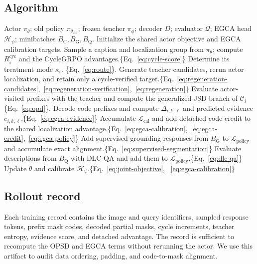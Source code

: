 \documentclass{article}
\newcommand{\ours}{\textsc{Pixel-OPSD}}
\begin{document}
\subsection{Algorithm}
\begin{algorithm}[h!t]
\caption{One training iteration of \ours{}.}\label{alg:pixel-opsd}
\small
\begin{algorithmic}[1]
\REQUIRE Actor $\pi_\theta$; old policy $\pi_{\theta_{\mathrm{old}}}$; frozen teacher $\pi_\phi$; decoder $D$; evaluator $\mathcal Q$; EGCA head $\mathcal H_\psi$; minibatches $B_{\mathrm{C}},B_{\mathrm{G}},B_{\mathrm{Q}}$.
\STATE Initialize the shared actor objective and EGCA calibration targets.
\STATE Sample a caption and localization group from $\pi_\theta$; compute $R_i^{\mathrm{cyc}}$ and the CycleGRPO advantages.\{Eq.~\eqref{eq:cycle-score}\}
\STATE Determine its treatment mode $\kappa_i$. \{Eq.~\eqref{eq:route}\}.
\STATE Generate teacher candidates, rerun actor localization, and retain only a cycle-verified target.\{Eq.~\eqref{eq:regeneration-candidates},~\eqref{eq:regeneration-verification},~\eqref{eq:regeneration}\}
\STATE Evaluate actor-visited prefixes with the teacher and compute the generalized-JSD branch of $\mathcal C_i$\{Eq.~\eqref{eq:opd}\}.
\ENDIF
{}
\STATE Decode code prefixes and compute $\Delta_{i,k,\ell}$ and predicted evidence $e_{i,k,\ell}$.\{Eq.~\eqref{eq:egca-evidence}\}
\STATE Accumulate $\mathcal L_{\mathrm{cal}}$ and add detached code credit to the shared localization advantage.\{Eq.~\eqref{eq:egca-calibration},~\eqref{eq:egca-credit},~\eqref{eq:egca-policy}\}
\ENDFOR
\ENDFOR
\ENDFOR
\STATE Add supervised grounding responses from $B_{\mathrm{G}}$ to $\mathcal L_{\mathrm{policy}}$ and accumulate exact alignment.\{Eq.~\eqref{eq:supervised-segmentation}\}
\STATE Evaluate descriptions from $B_{\mathrm{Q}}$ with DLC-QA and add them to $\mathcal L_{\mathrm{policy}}$.\{Eq.~\eqref{eq:dlc-qa}\}
\STATE Update $\theta$ and calibrate $\mathcal H_\psi$.\{Eq.~\eqref{eq:joint-objective}, ~\eqref{eq:egca-calibration}\} 
\end{algorithmic}
\end{algorithm}
\subsection{Rollout record}Each training record contains the image and query identifiers, sampled response tokens, prefix mask codes, decoded partial masks, cycle increments, teacher entropy, evidence score, and detached advantage. The record is sufficient to recompute the OPSD and EGCA terms without rerunning the actor. We use this artifact to audit data ordering, padding, and code-to-mask alignment.
\end{document}
